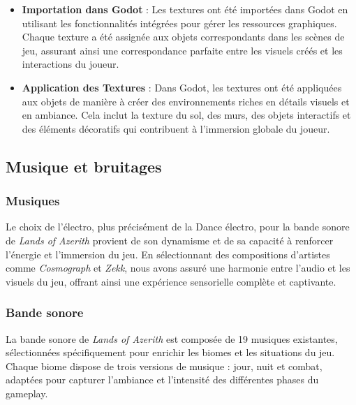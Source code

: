 \begin{itemize}
      \item \textbf{Importation dans Godot} : Les textures ont été importées dans Godot en utilisant les fonctionnalités intégrées pour gérer les ressources graphiques.
            Chaque texture a été assignée aux objets correspondants dans les scènes de jeu, assurant ainsi une correspondance parfaite entre les visuels créés et les interactions du joueur.
            \\

      \item \textbf{Application des Textures} : Dans Godot, les textures ont été appliquées aux objets de manière à créer des environnements riches en détails visuels et en ambiance.
            Cela inclut la texture du sol, des murs, des objets interactifs et des éléments décoratifs qui contribuent à l'immersion globale du joueur.
\end{itemize}

\subsection{Musique et bruitages}

\subsubsection{Musiques}

Le choix de l'électro, plus précisément de la Dance électro, pour la bande sonore de \textit{Lands of Azerith} provient de son dynamisme et de sa capacité à renforcer l'énergie et l'immersion du jeu.
En sélectionnant des compositions d'artistes comme \textit{Cosmograph} et \textit{Zekk}, nous avons assuré une harmonie entre l'audio et les visuels du jeu, offrant ainsi une expérience sensorielle complète et captivante.

\subsubsection{Bande sonore}

La bande sonore de \textit{Lands of Azerith} est composée de 19 musiques existantes, sélectionnées spécifiquement pour enrichir les biomes et les situations du jeu.
\\

Chaque biome dispose de trois versions de musique : jour, nuit et combat, adaptées pour capturer l'ambiance et l'intensité des différentes phases du gameplay.
\\

